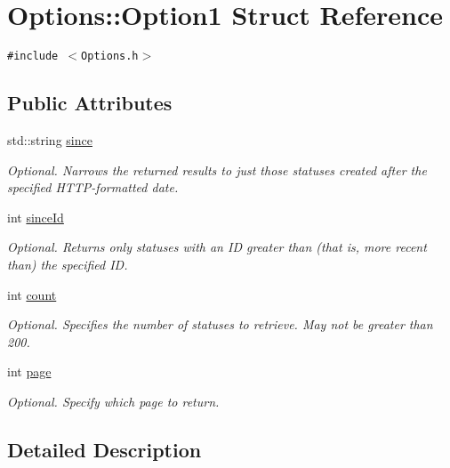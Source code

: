 \hypertarget{structOptions_1_1Option1}{
\section{Options::Option1 Struct Reference}
\label{structOptions_1_1Option1}
}
{\tt \#include $<$Options.h$>$}

\subsection*{Public Attributes}
\begin{CompactItemize}
\item 
std::string \hyperlink{structOptions_1_1Option1_2ab96937714ffcf4f979e156cd8bbc3e}{since}
\begin{CompactList}\small\item\em Optional. Narrows the returned results to just those statuses created after the specified HTTP-formatted date. \item\end{CompactList}\item 
int \hyperlink{structOptions_1_1Option1_a0ea505d9a08567500ae53803f980697}{sinceId}
\begin{CompactList}\small\item\em Optional. Returns only statuses with an ID greater than (that is, more recent than) the specified ID. \item\end{CompactList}\item 
int \hyperlink{structOptions_1_1Option1_6d67aea8f3f1fc784d74db6daa84eeea}{count}
\begin{CompactList}\small\item\em Optional. Specifies the number of statuses to retrieve. May not be greater than 200. \item\end{CompactList}\item 
int \hyperlink{structOptions_1_1Option1_d5fd1e637e8941192e7140ea69093b32}{page}
\begin{CompactList}\small\item\em Optional. Specify which page to return. \item\end{CompactList}\end{CompactItemize}


\subsection{Detailed Description}


